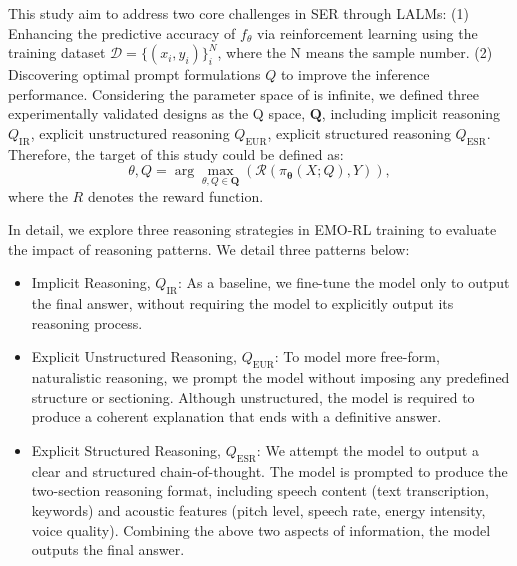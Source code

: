 \documentclass[11pt]{article}
\begin{document}
This study aim to address two core challenges in SER through LALMs: (1) Enhancing the predictive accuracy of $f_\theta$ via reinforcement learning using the training dataset $\mathcal{D}=\{(x_{i}, y_{i})\}^{N}_{i}$, where the N means the sample number. (2) Discovering optimal prompt formulations $Q$ to improve the inference performance. Considering the parameter space of is infinite, we defined three experimentally validated designs as the Q space, $\mathbf{Q}$, including implicit reasoning $Q_{\mathrm{IR}}$, explicit unstructured reasoning $Q_{\mathrm{EUR}}$, explicit structured reasoning $Q_{\mathrm{ESR}}$. Therefore, the target of this study could be defined as:
\begin{equation}
	\theta, Q = \arg \max_{\theta, Q \in \mathbf{Q}} (\mathcal{R}(\pi_{\boldsymbol{\theta}}(X;Q), Y)),
	\label{object}
\end{equation}
where the $R$ denotes the reward function.


In detail, we explore three reasoning strategies in
EMO-RL training to evaluate the impact of reasoning patterns. We detail three patterns below:
\begin{itemize}[leftmargin=10pt]
	\item Implicit Reasoning, $Q_{\mathrm{IR}}$: As a baseline, we fine-tune the model only to output the final answer, without requiring the model to explicitly output its reasoning process.
	\item Explicit Unstructured Reasoning, $Q_{\mathrm{EUR}}$: To model more free-form, naturalistic reasoning, we prompt the model without imposing any predefined structure or sectioning. Although unstructured, the model is required to produce a coherent explanation that ends with a definitive answer.
	\item Explicit Structured Reasoning, $Q_{\mathrm{ESR}}$: We attempt the model to output a clear and structured chain-of-thought. The model is prompted to produce the two-section reasoning format, including speech content (text transcription, keywords) and acoustic features (pitch level, speech rate, energy intensity, voice quality). Combining the above two aspects of information, the model outputs the final answer.
\end{itemize}
\end{document}
